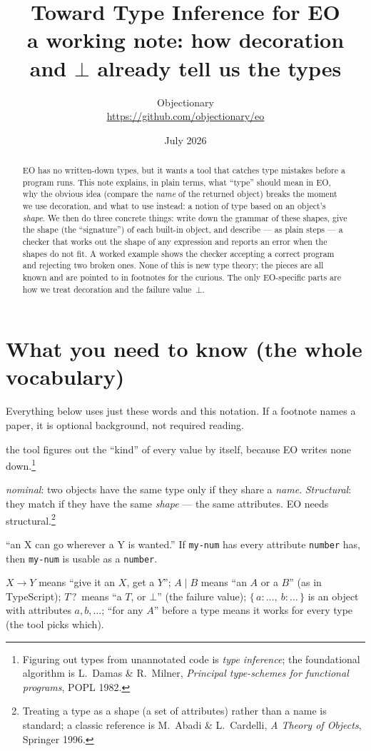 \documentclass[10pt]{article}
\title{\vspace{-1.5em}Toward Type Inference for EO\\[-0.2em]
  \large a working note: how decoration and $\bot$ already tell us the types}
\author{Objectionary\\\small\url{https://github.com/objectionary/eo}}
\date{July 2026}
\newcommand{\arr}{\to}               %
\newcommand{\opt}{\mathbin{?}}       %
\begin{document}
\maketitle
\vspace{-1.4em}

\begin{abstract}
\noindent
EO has no written-down types, but it wants a tool that catches type mistakes
before a program runs. This note explains, in plain terms, what ``type'' should
mean in EO, why the obvious idea (compare the \emph{name} of the returned
object) breaks the moment we use decoration, and what to use instead: a notion
of type based on an object's \emph{shape}. We then do three concrete things:
write down the grammar of these shapes, give the shape (the ``signature'') of
each built-in object, and describe --- as plain steps --- a checker that works
out the shape of any expression and reports an error when the shapes do not
fit. A worked example shows the checker accepting a correct program and
rejecting two broken ones. None of this is new type theory; the pieces are all
known and are pointed to in footnotes for the curious. The only EO-specific
parts are how we treat decoration and the failure value~$\bot$.
\end{abstract}

\section*{What you need to know (the whole vocabulary)}

Everything below uses just these words and this notation. If a footnote names a
paper, it is optional background, not required reading.

\begin{description}\setlength{\itemsep}{1pt}
\item[Type inference] the tool figures out the ``kind'' of every value by
  itself, because EO writes none down.\footnote{Figuring out types from
  unannotated code is \emph{type inference}; the foundational algorithm is
  L.~Damas \& R.~Milner, \emph{Principal type-schemes for functional programs},
  POPL 1982.}
\item[Nominal vs.\ structural] \emph{nominal}: two objects have the same type
  only if they share a \emph{name}. \emph{Structural}: they match if they have
  the same \emph{shape} --- the same attributes. EO needs structural.\footnote{%
  Treating a type as a shape (a set of attributes) rather than a name is
  standard; a classic reference is M.~Abadi \& L.~Cardelli, \emph{A Theory of
  Objects}, Springer 1996.}
\item[Usable-as (subtyping)] ``an X can go wherever a Y is wanted.'' If
  \texttt{my-num} has every attribute \texttt{number} has, then \texttt{my-num}
  is usable as a \texttt{number}.
\item[Notation] $X \arr Y$ means ``give it an $X$, get a $Y$'';\quad
  $A \mid B$ means ``an $A$ or a $B$'' (as in TypeScript);\quad
  $T\opt$ means ``a $T$, or $\bot$'' (the failure value);\quad
  $\{\,a:\dots,\ b:\dots\,\}$ is an object with attributes $a,b,\dots$;\quad
  ``for any $A$'' before a type means it works for every type (the tool picks
  which).
\end{description}
\end{document}
